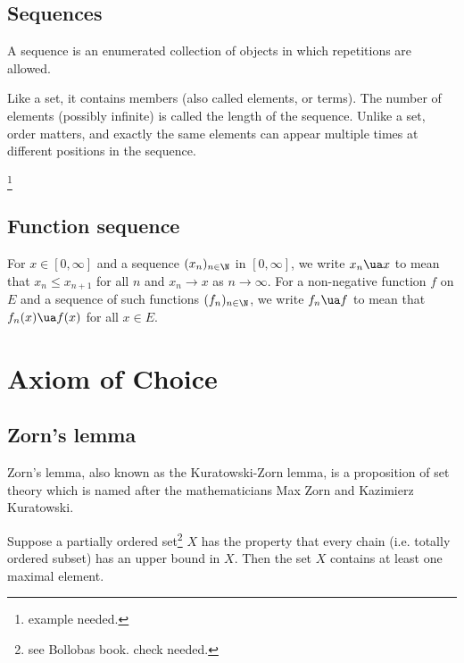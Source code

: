 \subsection{Sequences}

\begin{definition}[sequence]
A sequence is an enumerated collection of objects in which repetitions are allowed.
\end{definition}

\begin{remark}
Like a set, it contains members (also called elements, or terms). The number of elements (possibly infinite) is called the length of the sequence. Unlike a set, order matters, and exactly the same elements can appear multiple times at different positions in the sequence.
\end{remark}

\begin{example}
\footnote{example needed.}
\end{example}

\subsection{Function sequence}

\begin{definition}
For $x \in [0,\infty]$ and a sequence $(x_n)_{n \in\N}$ in $[0,\infty]$, we write $x_n \ua x$ to mean that $x_n \leq x_{n+1}$ for all $n$ and $x_n \to x$ as $n \to \infty$. For a non-negative
function $f$ on $E$ and a sequence of such functions $(f_n)_{n \in \N}$, we write $f_n \ua f$ to mean that $f_n(x) \ua f(x)$ for all $x \in E$.
\end{definition}


\section{Axiom of Choice}

\subsection{Zorn's lemma}

Zorn's lemma, also known as the Kuratowski-Zorn lemma, is a proposition of set theory which is named after the mathematicians Max Zorn and Kazimierz Kuratowski.

\begin{lemma}\label{lem:zorn}
Suppose a partially ordered set\footnote{see Bollobas book. check needed.} $X$ has the property that every chain (i.e. totally ordered subset) has an upper bound in $X$. Then the set $X$ contains at least one maximal element. 
\end{lemma}



